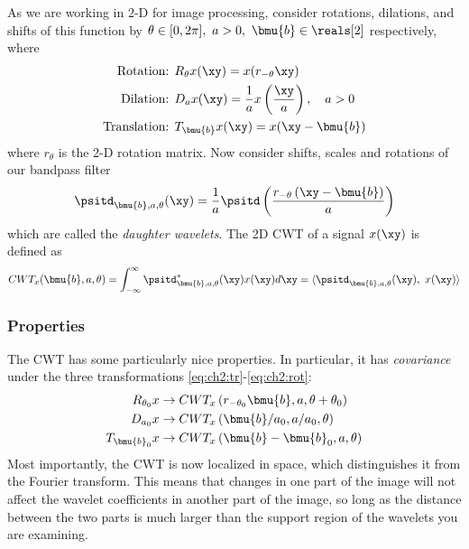 As we are working in 2-D for image processing, consider rotations, dilations, and 
shifts of this function by $\theta\in [0,2\pi],\ a>0,\ \bmu{b} \in \reals[2]$ respectively, where 
\begin{align}
  \text{Rotation: } & R_{\theta}x(\xy) = x(r_{-\theta}\xy) \label{eq:ch2:rot}\\
  \text{Dilation: } & D_{a}x(\xy) = \frac{1}{a} x\left(\frac{\xy}{a}\right), \quad a>0 \label{eq:ch2:di}\\
  \text{Translation: } & T_{\bmu{b}}x(\xy) = x(\xy - \bmu{b}) \label{eq:ch2:tr} 
\end{align}
where $r_\theta$ is the 2-D rotation matrix. Now consider shifts, scales and
rotations of our bandpass filter 
\begin{equation}
  \psitd_{\bmu{b},a, \theta}(\xy) = \frac{1}{a}\psitd \left(\frac{r_{-\theta}\left(\xy -
  \bmu{b}\right)}{a} \right) \label{eq:ch2:2d_shifts}
\end{equation}
which are called the \emph{daughter wavelets}. The 2D CWT of a signal $x(\xy)$ is defined as
\begin{equation}
  CWT_x(\bmu{b}, a, \theta) = \int_{-\infty}^{\infty} \psitd^*_{\bmu{b}, a,
  \theta}(\xy) x(\xy) d\xy = \langle \psitd_{\bmu{b}, a, \theta}(\xy),\ x(\xy)
  \rangle \label{eq:ch2:cwt}
\end{equation}

\subsubsection{Properties} 
The CWT has some particularly nice properties. In particular, it has \emph{covariance} 
under the three transformations \eqref{eq:ch2:tr}-\eqref{eq:ch2:rot}:
\begin{align}
  R_{\theta_0}x & \rightarrow CWT_x\left(r_{-\theta_0}\bmu{b}, a, \theta + \theta_0 \right)  \\
  D_{a_0}x & \rightarrow CWT_x\left(\bmu{b}/a_0, a/a_0, \theta \right) \\
  T_{\bmu{b}_0}x & \rightarrow CWT_x\left(\bmu{b}-\bmu{b}_0, a, \theta \right) 
\end{align}
Most importantly, the CWT is now localized in space, which distinguishes it from the
Fourier transform. This means that changes in one part of the image will not
affect the wavelet coefficients in another part of the image, so long as the
distance between the two parts is much larger than the support region of the
wavelets you are examining. 

